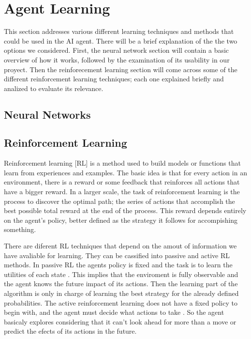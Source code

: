 \section{Agent Learning}\label{agent_learning}
This section addresses various different learning techniques and methods that could be used in the AI agent. There will be a brief explanation of the the two options we considered. First, the neural network section will contain a basic overview of how it works, followed by the examination of its usability in our proyect. Then the reinforecement learning section will come across some of the different reinforcement learning techniques;  each one explained briefly and analized to evaluate its relevance. 

\subsection*{Neural Networks}			 
			


\subsection*{Reinforcement Learning}

Reinforcement learning  [RL] is a method used to build models or functions that learn from experiences and examples. The basic idea is that for every action in an environment, there is a reward or some feedback that reinforces all actions that have a bigger reward. In a larger scale, the task of reinforcement learning is the process to discover the optimal path; the series of actions that accomplish the best possible total reward at the end of the process. This reward depends entirely on the agent's policy, better defined as the strategy it follows for accompishing something. 

There are diferent RL techniques that depend on the amout of information we have avaliable for learning. They can be cassified into passive and active RL methods. In passive RL the agents policy is fixed and the task is to learn the utilities of each state \cite[p764]{rl}. This implies that the enviroment is fully observable and the agent knows the future impact of its actions. Then the learning part of the algorithm is only in charge of learning the best strategy for the already defined probabilities. The active reinforcement learning does not have a fixed policy to begin with, and the agent must decide what actions to take \cite[p771]{rl}. So the agent basicaly explores considering that it can't look ahead for more than a move or predict the efects of its actions in the future. 

